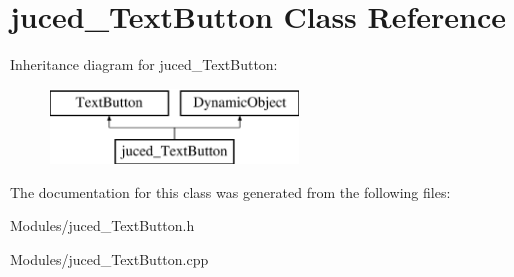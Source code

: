 \hypertarget{classjuced___text_button}{\section{juced\-\_\-\-Text\-Button Class Reference}
\label{classjuced___text_button}
}
Inheritance diagram for juced\-\_\-\-Text\-Button\-:\begin{figure}[H]
\begin{center}
\leavevmode
\includegraphics[height=2.000000cm]{classjuced___text_button}
\end{center}
\end{figure}


The documentation for this class was generated from the following files\-:\begin{DoxyCompactItemize}
\item 
Modules/juced\-\_\-\-Text\-Button.\-h\item 
Modules/juced\-\_\-\-Text\-Button.\-cpp\end{DoxyCompactItemize}
